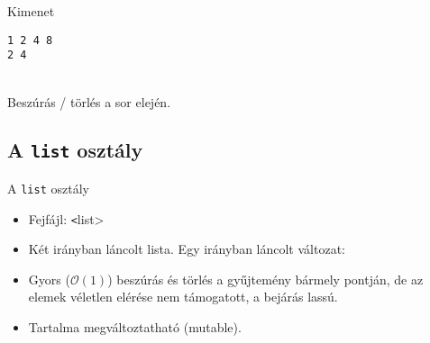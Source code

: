 \begin{frame}
    \begin{exampleblock}{}
        
    \end{exampleblock}
\end{frame}

\begin{frame}
    \begin{exampleblock}{}
        \small
        
    \end{exampleblock}
\end{frame}

\begin{frame}[fragile]
    \begin{block}{Kimenet}
        \vspace{-.4cm}
        \begin{verbatim}
1 2 4 8 
2 4
\end{verbatim}
        \vspace{-.3cm}
    \end{block}
    \vfill
    \begin{description}[m]
        \item[\hiv{\href{https://en.cppreference.com/w/cpp/container/deque/push_front}{\texttt{push\_front()}}}, \hiv{\href{https://en.cppreference.com/w/cpp/container/deque/pop_front}{\texttt{pop\_front()}}}] \hfill \\ Beszúrás / törlés a sor elején.
    \end{description}
\end{frame}

\subsection{A \texttt{list} osztály}

\begin{frame}
    A \texttt{list} osztály
    \begin{itemize}
        \item Fejfájl: \texttt<list>
        \item Két irányban láncolt lista. Egy irányban láncolt változat: 
        \item Gyors ($\mathcal{O}(1)$) beszúrás és törlés a gyűjtemény bármely pontján, de az elemek véletlen elérése nem támogatott, a bejárás lassú.
        \item Tartalma megváltoztatható (mutable).
    \end{itemize}
\end{frame}

